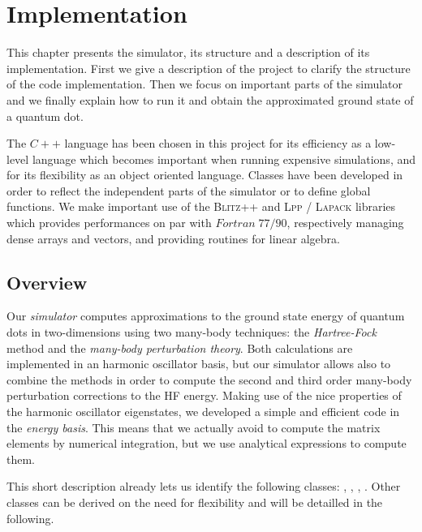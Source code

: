 \chapter{Implementation}
\label{implementation}

This chapter presents the simulator, its structure and a description of its implementation.
First we give a description of the project to clarify the structure of the code implementation. Then we focus on important parts of the simulator and we finally explain how to run it and obtain the approximated ground state of a quantum dot.

The $C++$ language has been chosen in this project for its efficiency as a low-level language which becomes important when running expensive simulations, and for its flexibility as an object oriented language. Classes have been developed in order to reflect the independent parts of the simulator or to define global functions. We make important use of the \textsc{Blitz++} and \textsc{Lpp / Lapack} libraries which provides performances on par with $Fortran \;77/90$, respectively managing dense arrays and vectors, and  providing routines for linear algebra.


\section{Overview}
\label{sec:overview}

Our \textit{simulator} \cite{codeLink} computes approximations to the ground state energy of quantum dots in two-dimensions using two many-body techniques: the \textit{Hartree-Fock} method and the \textit{many-body perturbation theory}. Both calculations are implemented in an harmonic oscillator basis, but our simulator allows also to combine the methods in order to compute the second and third order many-body perturbation corrections to the HF energy. Making use of the nice properties of the harmonic oscillator eigenstates, we developed a simple and efficient code in the \textit{energy basis}. This means that we actually avoid to compute the matrix elements by numerical integration, but we use analytical expressions to compute them.

This short description already lets us identify the following classes: , , , . Other classes can be derived  on the need for flexibility and will be detailled in the following.
% 

